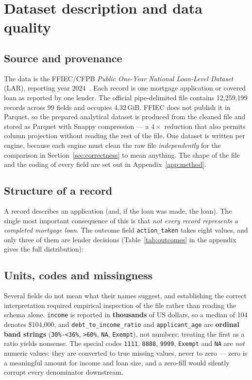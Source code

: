 \documentclass[sigconf,balance=false]{acmart}
\begin{document}


\section{Dataset description and data quality}\label{sec:dataset}

\subsection{Source and provenance}

The data is the FFIEC/CFPB \emph{Public One-Year National Loan-Level Dataset}
(LAR), reporting year 2024~\cite{ffiec}. Each record is one mortgage
application or covered loan as reported by one lender. The official
pipe-delimited file contains 12{,}259{,}199 records across 99 fields and
occupies 4.32\,GiB. FFIEC does not publish it in Parquet, so the prepared
analytical dataset is produced from the cleaned file and stored as Parquet
with Snappy compression --- a $4\times$ reduction that also permits column
projection without reading the rest of the file. One dataset is written per
engine, because each engine must clean the raw file \emph{independently}
for the comparison in Section~\ref{sec:correctness} to mean anything. The
shape of the file and the coding of every field are set out in
Appendix~\ref{app:method}.

\subsection{Structure of a record}

A record describes an application (and, if the loan was made, the loan). The
single most important consequence of this is that \emph{not every record
represents a completed mortgage loan}. The outcome field
\texttt{action\_\allowbreak taken} takes eight values, and only three of them
are lender decisions (Table~\ref{tab:outcomes} in the appendix gives the
full distribution):

\subsection{Units, codes and missingness}

Several fields do not mean what their names suggest, and establishing the
correct interpretation required empirical inspection of the file rather than
reading the schema alone. \texttt{income} is reported in \textbf{thousands}
of US dollars, so a median of 104 denotes \$104{,}000, and
\texttt{debt\_\allowbreak to\_\allowbreak income\_\allowbreak ratio} and
\texttt{applicant\_\allowbreak age} are \textbf{ordinal band strings}
(\texttt{30\%-<36\%}, \texttt{>60\%}, \texttt{NA}, \texttt{Exempt}), not
numbers; treating the first as a ratio yields nonsense. The special codes
\texttt{1111}, \texttt{8888}, \texttt{9999}, \texttt{Exempt} and \texttt{NA}
are \emph{not} numeric values: they are converted to true missing values,
never to zero --- zero is a meaningful amount for income and loan size, and
a zero-fill would silently corrupt every denominator downstream.
\end{document}
